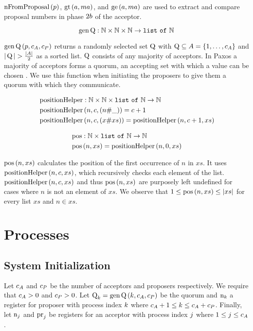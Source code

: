 $\operatorname{nFromProposal}\left(p \right)$, $\operatorname{gt}\left(a, ma\right)$, and $\operatorname{ge}\left(a, ma\right)$ are used to extract and compare proposal numbers in phase $2b$ of the acceptor.

\[\operatorname{gen\operatorname{Q}} : \mathbb{N} \times \mathbb{N} \times \mathbb{N} \to \mathtt{list\ of\ } \mathbb{N}\]

$\operatorname{gen\operatorname{Q}}\left(p, c_A, c_P\right)$ returns a randomly selected set $\operatorname{Q}$ with $\operatorname{Q} \subseteq A = \left\{1, \ldots, c_A\right\}$ and $|\operatorname{Q}| > \frac{|A|}{2}$ as a sorted list.
$\operatorname{Q}$ consists of any majority of acceptors.
In Paxos a majority of acceptors forms a quorum, \ie an accepting set with which a value can be chosen \cite{Lamport06}.
We use this function when initiating the proposers to give them a quorum with which they communicate.

\begin{align*}
&\operatorname{positionHelper} : \mathbb{N} \times \mathbb{N} \times \mathtt{list\ of\ } \mathbb{N} \to \mathbb{N}\\
&\operatorname{positionHelper}\left(n, c, \left(n \mathtt{\#} \mathtt{\_}\right)\right) = c + 1\\
&\operatorname{positionHelper}\left(n, c, \left(x \mathtt{\#} xs\right)\right) = \operatorname{positionHelper}\left(n, c + 1, xs\right)
\end{align*}

\begin{align*}
&\operatorname{pos} : \mathbb{N} \times \mathtt{list\ of\ } \mathbb{N} \to \mathbb{N}\\
&\operatorname{pos}\left(n, xs\right) = \operatorname{positionHelper}\left(n, 0, xs\right)
\end{align*}

$\operatorname{pos}\left(n, xs\right)$ calculates the position of the first occurrence of $n$ in $xs$.
It uses $\operatorname{positionHelper}\left(n, c, xs\right)$, which recursively checks each element of the list.
$\operatorname{positionHelper}\left(n, c, xs\right)$ and thus $\operatorname{pos}\left(n, xs\right)$ are purposely left undefined for cases where $n$ is not an element of $xs$.
We observe that $1 \leq \operatorname{pos}\left(n, xs\right) \leq |xs|$ for every list $xs$ and $n \in xs$.

\section{Processes}
\subsection{System Initialization}
Let $c_A$ and $c_P$ be the number of acceptors and proposers respectively.
We require that $c_A > 0$ and $c_P > 0$.
Let $\operatorname{Q}_{k} = \operatorname{gen\operatorname{Q}}\left(k, c_A, c_P\right)$ be the quorum and $\operatorname{n}_{k}$ a register for proposer with process index $k$ where $c_A + 1 \leq k \leq c_A + c_P$.
Finally, let $\operatorname{n}_{j}$ and $\operatorname{pr}_{j}$ be registers for an acceptor with process index $j$ where $1 \leq j \leq c_A$.

